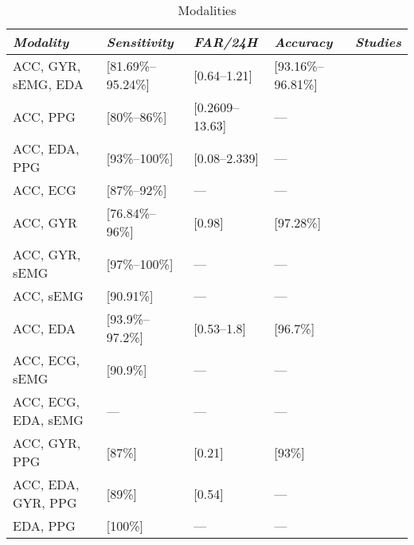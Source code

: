 
\begin{table}
    \caption{Modalities}
    \vspace{1em}
    \label{tab:modalities}
    \footnotesize
\begin{tabularx}{\textwidth}{lXXXX}
    
\hline
\textit{Modality} & \textit{Sensitivity} & \textit{FAR/24H} & \textit{Accuracy} & \textit{Studies} \Tstrut\Bstrut \\
\hline \Tstrut
ACC, GYR, sEMG, EDA & [81.69\%--95.24\%] & [0.64--1.21] & [93.16\%--96.81\%] & \cite{Wang2025-ql, Ge2023-ab, Li2022-ty, Wu2024-yl, Wang2022-lt} \\
ACC, PPG & [80\%--86\%] & [0.2609--13.63] & --- & \cite{Ali2020-ke, Tang2021-td, Arends2018-ew, Yu2023-ss} \\
ACC, EDA, PPG & [93\%--100\%] & [0.08--2.339] & --- & \cite{Xu2022-tx, Nasseri2021-xn} \\
ACC, ECG & [87\%--92\%] & --- & --- & \cite{Van_Andel2017-yx, Hegarty-Craver2021-hk} \\
ACC, GYR & [76.84\%--96\%] & [0.98] & [97.28\%] & \cite{Larsen2024-vn, Dong2022-oo} \\
ACC, GYR, sEMG & [97\%--100\%] & --- & --- & \cite{Wang2025-my, Gheryani2017-yg} \\
ACC, sEMG & [90.91\%] & --- & --- & \cite{Milosevic2016-ee} \\
ACC, EDA & [93.9\%--97.2\%] & [0.53--1.8] & [96.7\%] & \cite{Regalia2019-ch, Poh2012-af, Chowdhury2022-bi} \\
ACC, ECG, sEMG & [90.9\%] & --- & --- & \cite{De_Cooman2018-pq} \\
ACC, ECG, EDA, sEMG & --- & --- & --- & \cite{Hamlin2021-sd} \\
ACC, GYR, PPG & [87\%] & [0.21] & [93\%] & \cite{Vakilna2024-hk} \\
ACC, EDA, GYR, PPG & [89\%] & [0.54] & --- & \cite{Jiang2022-zu} \\
EDA, PPG & [100\%] & --- & --- & \cite{Cogan2017-lg}

\end{tabularx}

\end{table}